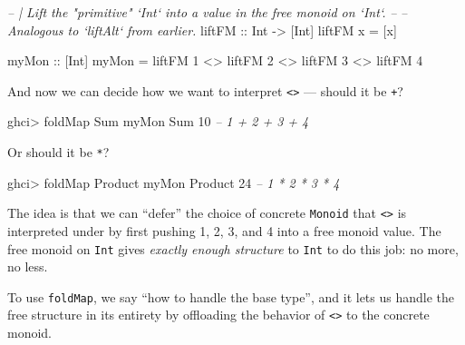 \documentclass[]{article}
\newenvironment{Shaded}{}{}
\newcommand{\CommentTok}[1]{\textcolor[rgb]{0.38,0.63,0.69}{\textit{#1}}}
\newcommand{\DataTypeTok}[1]{\textcolor[rgb]{0.56,0.13,0.00}{#1}}
\newcommand{\DecValTok}[1]{\textcolor[rgb]{0.25,0.63,0.44}{#1}}
\newcommand{\FunctionTok}[1]{\textcolor[rgb]{0.02,0.16,0.49}{#1}}
\newcommand{\NormalTok}[1]{#1}
\newcommand{\OtherTok}[1]{\textcolor[rgb]{0.00,0.44,0.13}{#1}}
\begin{document}
\begin{Shaded}
\begin{Highlighting}[]
\CommentTok{-- | Lift the "primitive" `Int` into a value in the free monoid on `Int`.}
\CommentTok{--}
\CommentTok{-- Analogous to `liftAlt` from earlier.}
\OtherTok{liftFM ::} \DataTypeTok{Int} \OtherTok{->}\NormalTok{ [}\DataTypeTok{Int}\NormalTok{]}
\NormalTok{liftFM x }\FunctionTok{=}\NormalTok{ [x]}

\OtherTok{myMon ::}\NormalTok{ [}\DataTypeTok{Int}\NormalTok{]}
\NormalTok{myMon }\FunctionTok{=}\NormalTok{ liftFM }\DecValTok{1} \FunctionTok{<>}\NormalTok{ liftFM }\DecValTok{2} \FunctionTok{<>}\NormalTok{ liftFM }\DecValTok{3} \FunctionTok{<>}\NormalTok{ liftFM }\DecValTok{4}
\end{Highlighting}
\end{Shaded}

And now we can decide how we want to interpret
\texttt{\textless{}\textgreater{}} --- should it be \texttt{+}?

\begin{Shaded}
\begin{Highlighting}[]
\NormalTok{ghci}\FunctionTok{>} \FunctionTok{foldMap} \DataTypeTok{Sum}\NormalTok{ myMon}
\DataTypeTok{Sum} \DecValTok{10}              \CommentTok{-- 1 + 2 + 3 + 4}
\end{Highlighting}
\end{Shaded}

Or should it be \texttt{*}?

\begin{Shaded}
\begin{Highlighting}[]
\NormalTok{ghci}\FunctionTok{>} \FunctionTok{foldMap} \DataTypeTok{Product}\NormalTok{ myMon}
\DataTypeTok{Product} \DecValTok{24}          \CommentTok{-- 1 * 2 * 3 * 4}
\end{Highlighting}
\end{Shaded}

The idea is that we can ``defer'' the choice of concrete \texttt{Monoid} that
\texttt{\textless{}\textgreater{}} is interpreted under by first pushing 1, 2,
3, and 4 into a free monoid value. The free monoid on \texttt{Int} gives
\emph{exactly enough structure} to \texttt{Int} to do this job: no more, no
less.

To use \texttt{foldMap}, we say ``how to handle the base type'', and it lets us
handle the free structure in its entirety by offloading the behavior of
\texttt{\textless{}\textgreater{}} to the concrete monoid.
\end{document}
